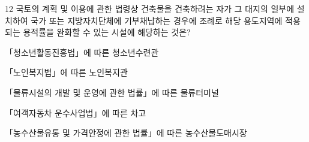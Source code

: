 \begin{question}{12}
국토의 계획 및 이용에 관한 법령상 건축물을 건축하려는 자가 그 대지의 일부에 설치하여 국가 또는 지방자치단체에 기부채납하는 경우에 조례로 해당 용도지역에 적용되는 용적률을 완화할 수 있는 시설에 해당하는 것은?
\begin{choices}
  \item 「청소년활동진흥법」에 따른 청소년수련관
  \item 「노인복지법」에 따른 노인복지관
  \item 「물류시설의 개발 및 운영에 관한 법률」에 따른 물류터미널
  \item 「여객자동차 운수사업법」에 따른 차고
  \item 「농수산물유통 및 가격안정에 관한 법률」에 따른 농수산물도매시장
\end{choices}
\end{question}
